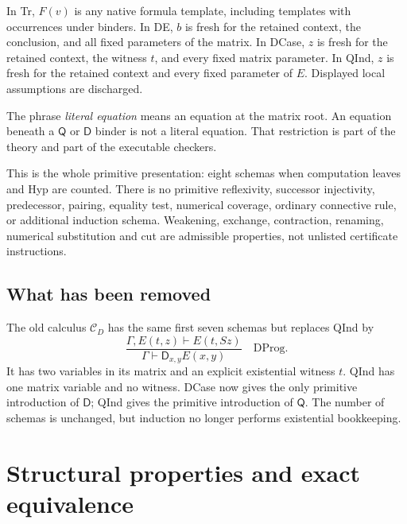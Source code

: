\documentclass[11pt,letterpaper]{article}
\theoremstyle{definition}\newtheorem{definition}[theorem]{Definition}
\theoremstyle{remark}\newtheorem{remark}[theorem]{Remark}
\newcommand{\CD}{\mathcal C_D}
\newcommand{\D}{\mathsf D}
\newcommand{\Q}{\mathsf Q}
\begin{document}
In Tr, $F(v)$ is any native formula template, including templates with
occurrences under binders. In DE, $b$ is fresh for the retained context,
the conclusion, and all fixed parameters of the matrix. In DCase, $z$ is
fresh for the retained context, the witness $t$, and every fixed matrix
parameter. In QInd, $z$ is fresh for the retained context and every fixed
parameter of $E$. Displayed local assumptions are discharged.

The phrase \emph{literal equation} means an equation at the matrix root.
An equation beneath a $\Q$ or $\D$ binder is not a literal equation.
That restriction is part of the theory and part of the executable checkers.

This is the whole primitive presentation: eight schemas when computation
leaves and Hyp are counted. There is no primitive reflexivity,
successor injectivity, predecessor, pairing, equality test, numerical
coverage, ordinary connective rule, or additional induction schema.
Weakening, exchange, contraction, renaming, numerical substitution and
cut are admissible properties, not unlisted certificate instructions.

\subsection{What has been removed}

The old calculus $\CD$ has the same first seven schemas but replaces
QInd by
\[
 \frac{\Gamma,E(t,z)\vdash E(t,Sz)}
      {\Gamma\vdash\D_{x,y}E(x,y)}\quad\mathrm{DProg}.
\]
It has two variables in its matrix and an explicit existential witness
$t$. QInd has one matrix variable and no witness. DCase now gives the
only primitive introduction of $\D$; QInd gives the primitive introduction
of $\Q$. The number of schemas is unchanged, but induction no longer
performs existential bookkeeping.

\section{Structural properties and exact equivalence}
\end{document}
